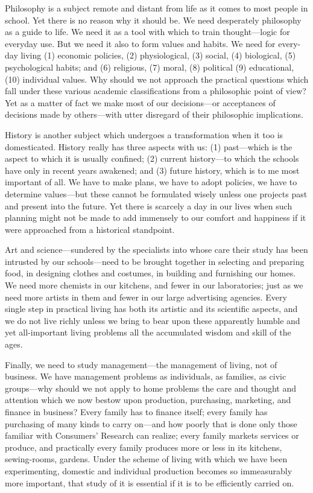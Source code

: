 \documentclass{book}
\begin{document}
Philosophy is a subject remote and distant from life as it comes to most people in school. Yet there is no reason why it should be. We need desperately philosophy as a guide to life. We need it as a tool with which to train thought—logic for everyday use. But we need it also to form values and habits. We need for every-day living (1) economic policies, (2) physiological, (3) social, (4) biological, (5) psychological habits; and (6) religious, (7) moral, (8) political (9) educational, (10) individual values. Why should we not approach the practical questions which fall under these various academic classifications from a philosophic point of view? Yet as a matter of fact we make most of our decisions—or acceptances of decisions made by others—with utter disregard of their philosophic implications.

History is another subject which undergoes a transformation when it too is domesticated. History really has three aspects with us: (1) past—which is the aspect to which it is usually confined; (2) current history—to which the schools have only in recent years awakened; and (3) future history, which is to me most important of all. We have to make plans, we have to adopt policies, we have to determine values—but these cannot be formulated wisely unless one projects past and present into the future. Yet there is scarcely a day in our lives when such planning might not be made to add immensely to our comfort and happiness if it were approached from a historical standpoint.

Art and science—sundered by the specialists into whose care their study has been intrusted by our schools—need to be brought together in selecting and preparing food, in designing clothes and costumes, in building and furnishing our homes. We need more chemists in our kitchens, and fewer in our laboratories; just as we need more artists in them and fewer in our large advertising agencies. Every single step in practical living has both its artistic and its scientific aspects, and we do not live richly unless we bring to bear upon these apparently humble and yet all-important living problems all the accumulated wisdom and skill of the ages.

Finally, we need to study management—the management of living, not of business. We have management problems as individuals, as families, as civic groups—why should we not apply to home problems the care and thought and attention which we now bestow upon production, purchasing, marketing, and finance in business? Every family has to finance itself; every family has purchasing of many kinds to carry on—and how poorly that is done only those familiar with Consumers’ Research can realize; every family markets services or produce, and practically every family produces more or less in its kitchens, sewing-rooms, gardens. Under the scheme of living with which we have been experimenting, domestic and individual production becomes so immeasurably more important, that study of it is essential if it is to be efficiently carried on.
\end{document}
